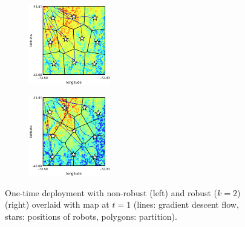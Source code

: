 \documentclass[letterpaper, 10 pt, conference]{ieeeconf}
\begin{document}
\begin{figure}
		\centering
	\begin{subfigure}[b]{0.23\textwidth}
		\centering				
  	\includegraphics[width=1.4in]{figure/new_path1}
	\caption{}
\end{subfigure}  
	\begin{subfigure}[b]{0.23\textwidth}
	\centering		
  	  	\includegraphics[width=1.4in]{figure/new_path2}
	\caption{}
\end{subfigure}    	  	
	\caption{One-time deployment with non-robust (left) and robust ($k=2$) (right) overlaid with map at $t=1$ (lines: gradient descent flow, stars: positions of robots, polygons: partition).}
	\label{fig:fig2}
\end{figure}
\end{document}
